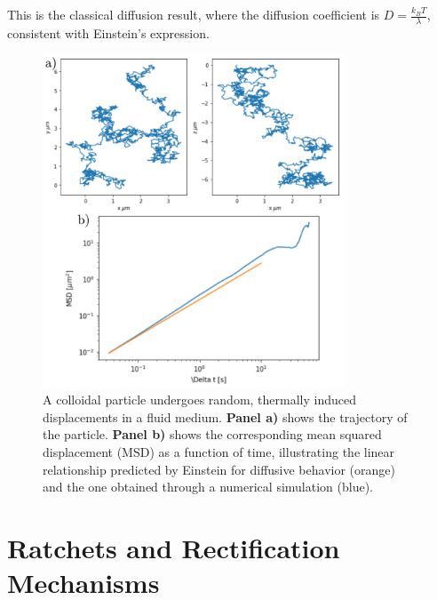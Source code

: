 This is the classical diffusion result, where the diffusion coefficient is \( D = \frac{k_B T}{\lambda} \), consistent with Einstein's expression.





\begin{figure}[H]
  \begin{center}
    \includegraphics[width=0.8\textwidth]{figures/passivebrowniantrajectorymsd.pdf}
  \end{center}
  \caption[Example of brownian motion]{A colloidal particle undergoes random, thermally induced displacements in a fluid medium. \textbf{Panel a)} shows the trajectory of the particle. \textbf{ Panel b)} shows the corresponding mean squared displacement (MSD) as a function of time, illustrating the linear relationship predicted by Einstein for diffusive behavior (orange) and the one obtained through a numerical simulation (blue).}\label{fig:passivebrowniantrajectory}
\end{figure}

\chapter{Ratchets and Rectification Mechanisms}
\label{ch:ratchetsandrectificationmechanisms}

